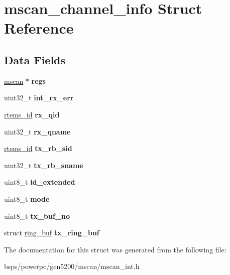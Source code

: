 \hypertarget{structmscan__channel__info}{}\section{mscan\+\_\+channel\+\_\+info Struct Reference}
\label{structmscan__channel__info}
\subsection*{Data Fields}
\begin{DoxyCompactItemize}
\item 
\mbox{\label{structmscan__channel__info_a95a17caa65c9e4799ab5df07ca090408}} 
\mbox{\hyperlink{group__RTEMSBSPsPowerPCGen5200MSCAN_gacfd56a4a482c5e7da2cff003284b2d51}{mscan}} $\ast$ {\bfseries regs}
\item 
\mbox{\label{structmscan__channel__info_a3f76664ab1c3e249d7fc6c53f58402d7}} 
uint32\+\_\+t {\bfseries int\+\_\+rx\+\_\+err}
\item 
\mbox{\label{structmscan__channel__info_ac1a562377957f01570a96dd1c5a2ac56}} 
\mbox{\hyperlink{group__ClassicTasks_gab20892b814dced7dd4e5b9bf42becd57}{rtems\+\_\+id}} {\bfseries rx\+\_\+qid}
\item 
\mbox{\label{structmscan__channel__info_acfcfb1b09cc8733559ccef50b0ac57d8}} 
uint32\+\_\+t {\bfseries rx\+\_\+qname}
\item 
\mbox{\label{structmscan__channel__info_a4291cf2d90cc8e11cc6d6c8acb37fbc8}} 
\mbox{\hyperlink{group__ClassicTasks_gab20892b814dced7dd4e5b9bf42becd57}{rtems\+\_\+id}} {\bfseries tx\+\_\+rb\+\_\+sid}
\item 
\mbox{\label{structmscan__channel__info_a5ea9a6310daa1c43333ad5ecbb655443}} 
uint32\+\_\+t {\bfseries tx\+\_\+rb\+\_\+sname}
\item 
\mbox{\label{structmscan__channel__info_a06069f88ac49f8c2aa4cdd33fff4e306}} 
uint8\+\_\+t {\bfseries id\+\_\+extended}
\item 
\mbox{\label{structmscan__channel__info_aae15d643c99fe8e258e1c55354cba0ce}} 
uint8\+\_\+t {\bfseries mode}
\item 
\mbox{\label{structmscan__channel__info_a0c21e0ffb46926843d98b419ca7b5e1e}} 
uint8\+\_\+t {\bfseries tx\+\_\+buf\+\_\+no}
\item 
\mbox{\label{structmscan__channel__info_adcea1aed22941793f6671af03ae6dbd9}} 
struct \mbox{\hyperlink{structring__buf}{ring\+\_\+buf}} {\bfseries tx\+\_\+ring\+\_\+buf}
\end{DoxyCompactItemize}


The documentation for this struct was generated from the following file\+:\begin{DoxyCompactItemize}
\item 
bsps/powerpc/gen5200/mscan/mscan\+\_\+int.\+h\end{DoxyCompactItemize}
